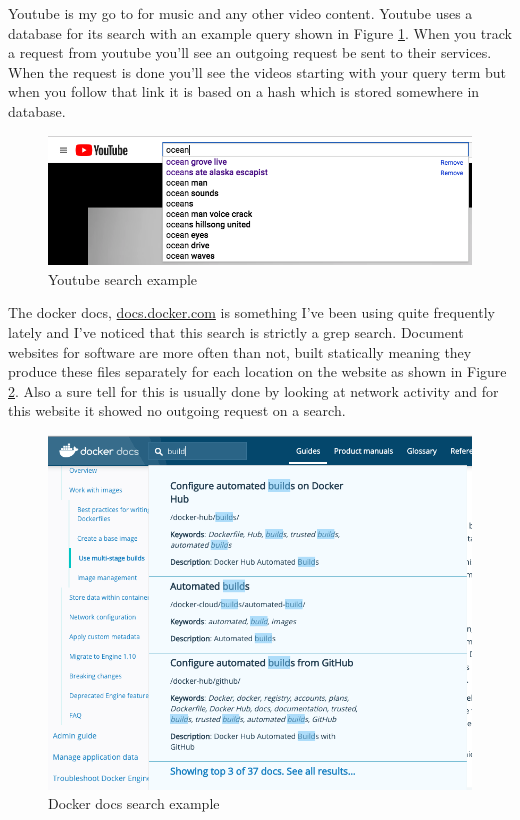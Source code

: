 \documentclass[letterpaper,11pt]{article}
\begin{document}
Youtube is my go to for music and any other video content. 
Youtube uses a database for its search with an example query shown in Figure \ref{fig:youtube}. 
When you track a request from youtube you'll see an outgoing request be sent to their services. 
When the request is done you'll see the videos starting with your query term but when you follow that link it is based on a hash which is stored somewhere in database.

\begin{figure}[h]
\centering
\includegraphics[scale=0.35]{youtube.png}
\caption{Youtube search example}
\label{fig:youtube}
\end{figure}

The docker docs, \url{docs.docker.com} is something I've been using quite frequently lately and I've noticed that this search is strictly a grep search. 
Document websites for software are more often than not, built statically meaning they produce these files separately for each location on the website as shown in Figure \ref{fig:docker}.
Also a sure tell for this is usually done by looking at network activity and for this website it showed no outgoing request on a search.

\begin{figure}[h]
\centering
\includegraphics[scale=0.35]{docker.png}
\caption{Docker docs search example}
\label{fig:docker}
\end{figure}
\end{document}
